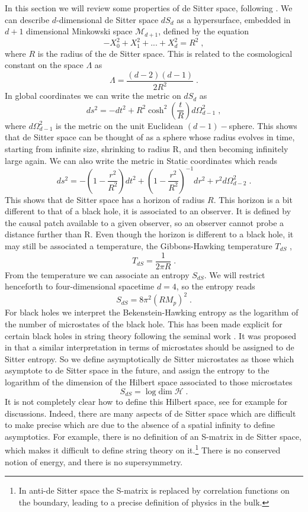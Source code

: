 \documentclass[11pt,a4paper]{article}
\numberwithin{equation}{section}
\numberwithin{table}{section}\setlength{\multlinegap}{25pt}
\newcommand{\cH}{\mathcal{H}}
\newcommand{\cM}{\mathcal M}
\newcommand{\be}{\begin{equation}}
\newcommand{\ee}{\end{equation}}
\begin{document}
{In this section we will review some properties of de Sitter space, following \cite{Witten:2001kn,Spradlin:2001pw}. We can describe $d$-dimensional de Sitter space $dS_d$ as a hypersurface, embedded in $d+1$ dimensional Minkowski space $\cM_{d+1}$, defined by the equation
\be
-X_0^2 + X_1^2 + ... + X_d^2 = R^2 \;,
\ee
where $R$ is the radius of the de Sitter space. This is related to the cosmological constant on the space $\Lambda$ as
\be
\Lambda = \frac{\left(d-2\right)\left(d-1 \right)}{2 R^2} \;. 
\ee 
In global coordinates we can write the metric on $dS_d$ as
\be
ds^2 = -dt^2 + R^2 \cosh^2\left(\frac{t}{R}\right) d\Omega^2_{d-1}\;,
\ee
where $d\Omega^2_{d-1}$ is the metric on the unit Euclidean $\left(d-1\right)-$sphere. This shows that de Sitter space can be thought of as a sphere whose radius evolves in time, starting from infinite size, shrinking to radius R, and then becoming infinitely large again. We can also write the metric in Static coordinates which reads
\be
ds^2 = - \left(1-\frac{r^2}{R^2} \right) dt^2 + \left(1-\frac{r^2}{R^2} \right)^{-1} dr^2 + r^2 d\Omega^2_{d-2} \;.
\ee
This shows that de Sitter space has a horizon of radius $R$. This horizon is a bit different to that of a black hole, it is associated to an observer. It is defined by the causal patch available to a given observer, so an observer cannot probe a distance further than R. Even though the horizon is different to a black hole, it may still be associated a temperature, the Gibbons-Hawking temperature $T_{dS}$ \cite{PhysRevD.15.2738},
\be
T_{dS} = \frac{1}{2 \pi R} \;.
\ee
From the temperature we can associate an entropy $S_{dS}$. We will restrict henceforth to four-dimensional spacetime $d=4$, so the entropy reads
\be
S_{dS} = 8\pi^2 \left(R M_p\right)^2 \;.
\label{dsentropy}
\ee
For black holes we interpret the Bekenstein-Hawking entropy as the logarithm of the number of microstates of the black hole. This has been made explicit for certain black holes in string theory following the seminal work \cite{Strominger:1996sh}.  It was proposed in \cite{Banks:2000fe,Witten:2001kn} that a similar interpretation in terms of microstates should be assigned to de Sitter entropy. So we define asymptotically de Sitter microstates as those which asymptote to de Sitter space in the future, and assign the entropy to the logarithm of the dimension of the Hilbert space associated to those microstates
\be
S_{dS} = \log \mathrm{dim} \;\cH \;.
\label{dsSH}
\ee
It is not completely clear how to define this Hilbert space, see for example \cite{Banks:2000fe,Witten:2001kn,Banks:2003cg} for discussions. Indeed, there are many aspects of de Sitter space which are difficult to make precise which are due to the absence of a spatial infinity to define asymptotics. For example, there is no definition of an S-matrix in de Sitter space, which makes it difficult to define string theory on it.\footnote{In anti-de Sitter space the S-matrix is replaced by correlation functions on the boundary, leading to a precise definition of physics in the bulk.} There is no conserved notion of energy, and there is no supersymmetry.

}
\end{document}
